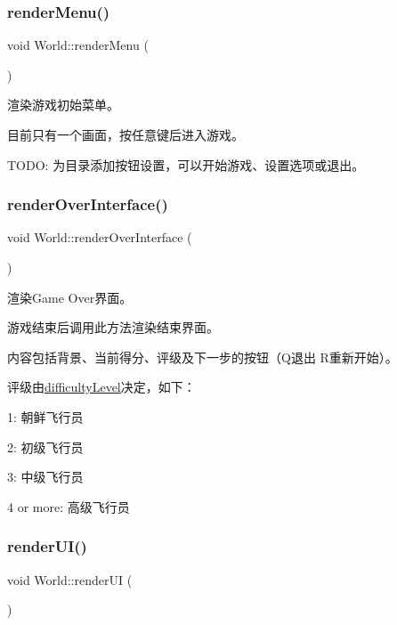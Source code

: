 \subsubsection{\texorpdfstring{render\+Menu()}{renderMenu()}}
{\footnotesize\ttfamily void World\+::render\+Menu (\begin{DoxyParamCaption}{ }\end{DoxyParamCaption})}



渲染游戏初始菜单。 

目前只有一个画面，按任意键后进入游戏。

T\+O\+DO\+: 为目录添加按钮设置，可以开始游戏、设置选项或退出。 \mbox{\label{class_world_ae265f543993824e9cca76eef29e375cb}} 
\subsubsection{\texorpdfstring{render\+Over\+Interface()}{renderOverInterface()}}
{\footnotesize\ttfamily void World\+::render\+Over\+Interface (\begin{DoxyParamCaption}{ }\end{DoxyParamCaption})}



渲染\+Game Over界面。 

游戏结束后调用此方法渲染结束界面。

内容包括背景、当前得分、评级及下一步的按钮（\+Q退出 R重新开始）。

评级由\hyperlink{class_world_a594e81a86f319eea4e8e5a2029cdaa90}{difficulty\+Level}决定，如下：
\begin{DoxyItemize}
\item 1\+: 朝鲜飞行员
\item 2\+: 初级飞行员
\item 3\+: 中级飞行员
\item 4 or more\+: 高级飞行员 
\end{DoxyItemize}\mbox{\label{class_world_a96d63470a94d9ab0426db992981b5ce5}} 
\subsubsection{\texorpdfstring{render\+U\+I()}{renderUI()}}
{\footnotesize\ttfamily void World\+::render\+UI (\begin{DoxyParamCaption}{ }\end{DoxyParamCaption})\hspace{0.3cm}{\ttfamily [private]}}



